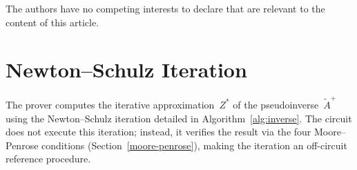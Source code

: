 \documentclass[runningheads]{llncs}
\begin{document}
\begin{credits}
\subsubsection{\discintname}
The authors have no competing interests to declare that are relevant to the content of this article.
\end{credits}




\appendix

\section{Newton--Schulz Iteration}
\label{appx:newton-schulz}

The prover computes the iterative approximation~$Z^{*}$ of the pseudoinverse~$\tilde{A}^{+}$ using the Newton--Schulz iteration detailed in Algorithm~\ref{alg:inverse}. The circuit does not execute this iteration; instead, it verifies the result via the four Moore--Penrose conditions (Section~\ref{moore-penrose}), making the iteration an off-circuit reference procedure.

\begin{algorithm}[H]
\raggedright
{}
\caption{Compute Moore--Penrose inverse}
\label{alg:inverse}
\end{algorithm}
\end{document}
